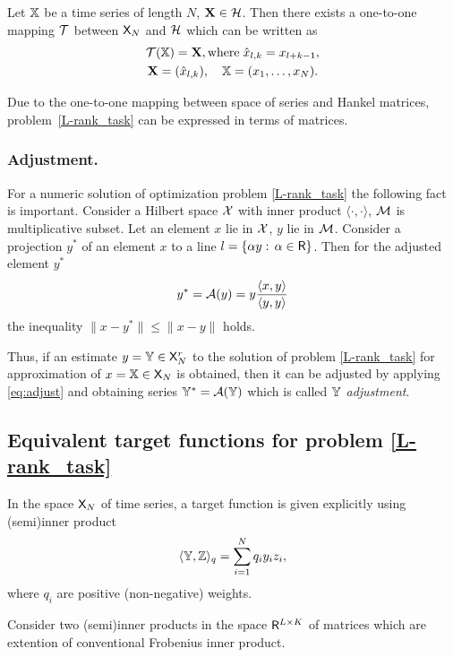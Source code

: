 \documentclass[sii]{ipart}
\begin{document}
Let $\mathbb{X}$ be a time series of length $N$, $\mathbf{X} \in \mathcal{H}$. Then there exists a one-to-one mapping $\mathcal{T}$ between $\mathsf{X}_N$ and $\mathcal{H}$ which can be written as
\begin{multline*}
\calT(\tsX) = \bfX, \text{where} \; \hat x_{l, k} = x_{l + k - 1}, \\ \bfX = (\hat x_{l,k}), \quad \tsX = (x_1, \ldots, x_N).
\end{multline*}

Due to the one-to-one mapping between space of series and Hankel matrices,
problem~\eqref{L-rank_task} can be expressed in terms of matrices.

\subsubsection{Adjustment.} For a numeric solution of optimization problem \eqref{L-rank_task} the following fact is important.
Consider a Hilbert space $\mathcal{X}$ with inner product $\langle\cdot, \cdot\rangle$, $\mathcal{M}$ is multiplicative subset. Let an element $x$ lie in $\mathcal{X}$, $y$ lie in $\mathcal{M}$. Consider a projection $y^*$ of an element $x$ to a line $l = \{\alpha y:\, \alpha \in \mathsf{R}\}$. Then for the adjusted element $y^*$
\begin{equation}
\label{eq:adjust}
y^* = \calA(y)= y \frac{\langle x, y\rangle}{\langle y, y\rangle}
\end{equation}
the inequality $\|x - y^*\| \le \|x - y\|$ holds.

Thus, if an estimate $y=\mathbb{Y} \in \mathsf{X}_N^r$ to the solution of problem \eqref{L-rank_task} for approximation of $x=\mathbb{X} \in \mathsf{X}_N$ is obtained, then it can be adjusted by applying \eqref{eq:adjust} and obtaining series $\mathbb{Y}^*=\mathcal{A}(\mathbb{Y})$ which is called \emph{$\mathbb{Y}$ adjustment}.

\subsection{Equivalent target functions for problem \eqref{L-rank_task}}
In the space $\mathsf{X}_N$ of time series, a target function is given explicitly using (semi)inner product
\begin{equation}
\label{eq:norm_ser}
\langle\tsY,\tsZ\rangle_q = \sum_{i = 1}^N q_i y_i z_i,
\end{equation}
where $q_i$ are positive (non-negative) weights.

Consider two (semi)inner products in the space $\mathsf{R}^{L \times K}$ of matrices which are extention of conventional Frobenius inner product.
\end{document}
